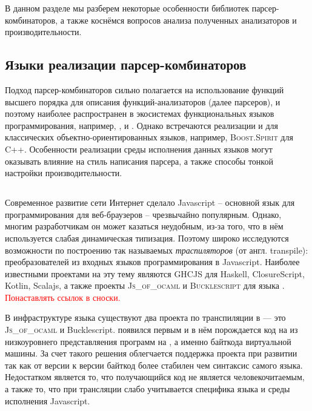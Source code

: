 В данном разделе мы разберем некоторые особенности библиотек парсер-комбинаторов, а также коснёмся вопросов анализа полученных анализаторов и производительности.

\subsection{Языки реализации парсер-комбинаторов}

Подход парсер-комбинаторов сильно полагается на использование функций высшего порядка для описания функций-анализаторов (далее парсеров), и поэтому наиболее распространен в экосистемах функциональных языков программирования, например, \OCaml{}, \Haskell{} и \Scala{}. Однако встречаются реализации и для классических объектно-ориенти\-ро\-ванных языков, например, \textsc{Boost.Spirit} для \textsc{C++}. 
Особенности реализации среды исполнения данных языков могут оказывать влияние на стиль написания парсера, а также способы тонкой настройки производительности.

\subsection{\ReScript}

Современное развитие сети Интернет  сделало Javascript -- основной язык для программирования для веб-браузеров -- чрезвычайно популярным.  Однако, многим разработчикам он может казаться неудобным, из-за того, что в нём используется слабая динамическая типизация. Поэтому широко исследуются возможности по построению так называемых \emph{траспиляторов} (от англ. transpile): преобразователей из входных языков программирования в Javascript. Наиболее известными проектами на эту тему являются 
\textsc{GHCJS} для Haskell, ClosureScript, Kotlin, Scalajs, 
а также проекты \textsc{Js\_of\_ocaml} и \textsc{Bucklescript} для языка \OCaml{}. \textcolor{red}{Понаставлять ссылок в сноски.}

В инфраструктуре языка \OCaml{} существуют два проекта по транспиляции в \Javascript{} --- это \textsc{Js\_of\_ocaml} и Bucklescript. \Jsoo{} появился первым и в нём порождается код на \Javascript{} из низкоуровнего представляения программ на \OCaml{}, а именно байткода виртуальной машины. За счет такого решения облегчается поддержка проекта при развитии \OCaml{} так как от версии к версии байткод более стабилен чем синтаксис самого языка. Недостатком \Jsoo{} является то, что получающийся код не является человекочитаемым, а также то, что при трансляции слабо учитывается специфика языка и среды исполнения Javascript. 

